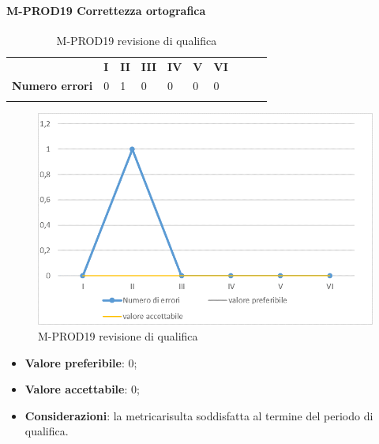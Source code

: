 \paragraph{M-PROD19 Correttezza ortografica} \mbox{}
\begin{longtable}[H!] {						
		>{}p{50mm}  		
		>{}p{8mm}
		>{}p{8mm}		
		>{}p{8mm}		
		>{}p{8mm}		
		>{}p{8mm}		
		>{}p{8mm}
		>{}p{8mm}
		>{}p{8mm}
		>{}p{8mm}
	}
	\rowcolor{gray!50}
	\textbf{} & \textbf{I} & \textbf{II} & \textbf{III} & \textbf{IV} & \textbf{V} & \textbf{VI} \TBstrut \\ [2mm]
	\textbf{Numero errori} & 0 & 1 & 0 & 0 & 0 & 0 \TBstrut \\ [2mm]
	\rowcolor{white}
	\caption{M-PROD19 revisione di qualifica}
\end{longtable}
\begin{figure}[H] 	
	\includegraphics[width=\linewidth]{./img/grafici/RQ19.png}	
	\caption{M-PROD19 revisione di qualifica}	
\end{figure}
\begin{itemize}
	\item \textbf{Valore preferibile}: 0;
	\item \textbf{Valore accettabile}: 0;
	\item \textbf{Considerazioni}: la metrica\glosp risulta soddisfatta al termine del periodo di qualifica.
\end{itemize}


